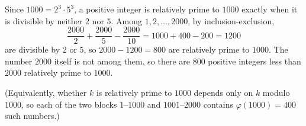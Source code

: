 Since $1000=2^3\cdot5^3$, a positive integer is relatively prime to $1000$ exactly when it is divisible by neither $2$ nor $5$. Among $1,2,\dots,2000$, by inclusion-exclusion,
\[\dfrac{2000}{2}+\dfrac{2000}{5}-\dfrac{2000}{10}=1000+400-200=1200\]
are divisible by $2$ or $5$, so $2000-1200=800$ are relatively prime to $1000$. The number $2000$ itself is not among them, so there are $\boxed{800}$ positive integers less than $2000$ relatively prime to $1000$.

(Equivalently, whether $k$ is relatively prime to $1000$ depends only on $k$ modulo $1000$, so each of the two blocks $1$--$1000$ and $1001$--$2000$ contains $\varphi(1000)=400$ such numbers.)

